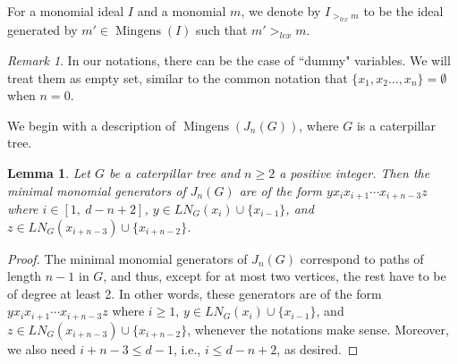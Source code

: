 \documentclass{amsart}
\newtheorem{lemma}[theorem]{Lemma}
\theoremstyle{remark}
\newtheorem{remark}[theorem]{Remark}
\theoremstyle{definition}
\DeclareMathOperator{\mingens}{Mingens}
\begin{document}
		For a monomial ideal $I$ and a monomial $m$, we denote by $I_{>_{lex}m}$ to be the ideal generated by $m' \in \mingens (I)$ such that $m'>_{lex} m$.

	
	\begin{remark}
		In our notations, there can be the case of ``dummy" variables. We will treat them as empty set, similar to the common notation that $\{x_1,x_2\dots, x_n\}=\emptyset$ when $n=0$.
	\end{remark}

    We begin with a description of $\mingens(J_n(G))$, where $G$ is a caterpillar tree.
	\begin{lemma}\label{lem:gens-Jn-caterpillar}
		Let $G$ be a caterpillar tree and $n\geq 2$ a positive integer. Then the minimal monomial generators of $J_n(G)$ are of the form $yx_ix_{i+1}\cdots x_{i+n-3}z$ where $i\in [1,\ d-n+2]$, $y\in LN_G(x_i)\cup \{x_{i-1}\}$, and $z\in  LN_G(x_{i+n-3})\cup \{x_{i+n-2}\}$.
	\end{lemma}
	\begin{proof}
		The minimal monomial generators of $J_n(G)$ correspond to paths of length $n-1$ in $G$, and thus, except for at most two vertices, the rest have to be of degree at least 2. In other words, these generators are of the form $yx_ix_{i+1}\cdots x_{i+n-3}z$ where $i\geq 1$, $y\in LN_G(x_i)\cup \{x_{i-1}\}$, and $z\in  LN_G(x_{i+n-3})\cup \{x_{i+n-2}\}$, whenever the notations make sense. Moreover, we also need $i+n-3\leq d-1$, i.e., $i\leq d-n+2$, as desired.
	\end{proof}
\end{document}
